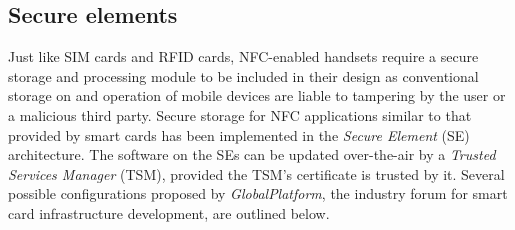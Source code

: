 


\subsection{Secure elements}
Just like SIM cards and RFID cards, NFC-enabled handsets require a secure storage and processing module to be included in their design as conventional storage on and operation of mobile devices are liable to tampering by the user or a malicious third party.
Secure storage for NFC applications similar to that provided by smart cards has been implemented in the \textit{Secure Element} (SE) architecture.
The software on the SEs can be updated over-the-air by a \textit{Trusted Services Manager} (TSM), provided the TSM's certificate is trusted by it.
Several possible configurations proposed by \textit{GlobalPlatform}, the industry forum for smart card infrastructure development, are outlined below. \cite{Reveilhac:2009:PSE:1548884.1549404,GlobalPlatformSEs}





